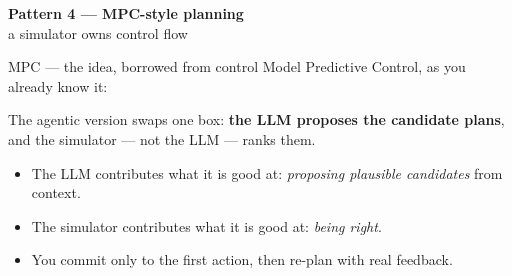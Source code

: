 \documentclass[aspectratio=169,10pt]{beamer}
\newcommand{\hl}[1]{\textcolor{accent}{\textbf{#1}}}
\begin{document}
\begin{frame}[plain]
\begin{center}
{\Large\bfseries Pattern 4 --- MPC-style planning}\\[0.5em]
{\large\color{gray} a simulator owns control flow}
\end{center}
\end{frame}

\begin{frame}{MPC --- the idea, borrowed from control}
Model Predictive Control, as you already know it:

\begin{center}
\end{center}

\vspace{0.8em}
The agentic version swaps one box: \hl{the LLM proposes the candidate plans},
and the simulator --- not the LLM --- ranks them.

\vspace{0.8em}
\begin{itemize}\itemsep3pt
  \item The LLM contributes what it is good at: \emph{proposing plausible
        candidates} from context.
  \item The simulator contributes what it is good at: \emph{being right}.
  \item You commit only to the first action, then re-plan with real feedback.
\end{itemize}
\end{frame}
\end{document}
